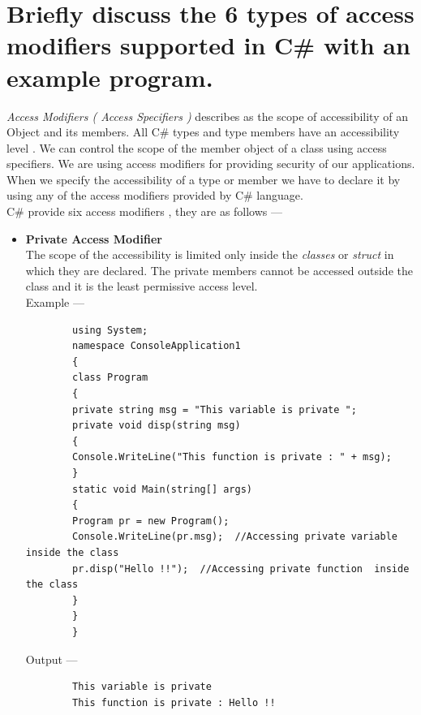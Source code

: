 \documentclass[11pt,dvipsnames,cmyk]{article}
\begin{document}
	 \section*{Briefly discuss the 6 types of access modifiers supported in C\# with an example program.}
	 \emph{Access Modifiers ( Access Specifiers )} describes as the scope of accessibility of an Object and its members. All C\# types and type members have an accessibility level . We can control the scope of the member object of a class using access specifiers. We are using access modifiers for providing security of our applications. When we specify the accessibility of a type or member we have to declare it by using any of the access modifiers provided by C\# language.
	 \\C\# provide six access modifiers , they are as follows ---
	 \begin{itemize}
	 	\item \textbf{Private Access Modifier}
	 	\\The scope of the accessibility is limited only inside the \emph{classes} or \emph{struct} in which they are declared. The private members cannot be accessed outside the class and it is the least permissive access level.
	 	\\Example ---
	 	\begin{verbatim}
	 	using System;
	 	namespace ConsoleApplication1
	 	{
	 	class Program
	 	{
	 	private string msg = "This variable is private ";
	 	private void disp(string msg)
	 	{
	 	Console.WriteLine("This function is private : " + msg);
	 	}
	 	static void Main(string[] args)
	 	{
	 	Program pr = new Program();
	 	Console.WriteLine(pr.msg);	//Accessing private variable  inside the class
	 	pr.disp("Hello !!");  //Accessing private function  inside the class
	 	}
	 	}
	 	}
	 	\end{verbatim}
	 	Output ---
	 	\begin{verbatim}
	 	This variable is private
	 	This function is private : Hello !!
	 	\end{verbatim}
	 	

\end{itemize}
\end{document}
